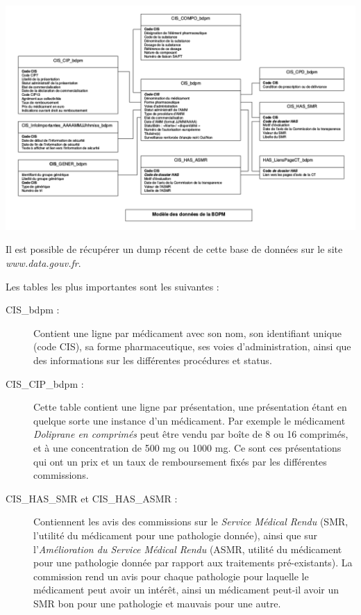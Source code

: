 \documentclass[a4paper, 12pt]{article}
\begin{document}
\begin{center}
\includegraphics[scale=0.45]{pics/schema.png}
\end{center} 

Il est possible de récupérer un dump récent de cette base de données sur le site \textit{www.data.gouv.fr}.

\smallskip

Les tables les plus importantes sont les suivantes :
\begin{description}
\item[CIS\_bdpm : ] Contient une ligne par médicament avec son nom, son identifiant unique (code CIS), sa forme pharmaceutique, ses voies d'administration, ainsi que des informations sur les différentes procédures et status.
\item[CIS\_CIP\_bdpm :] Cette table contient une ligne par présentation, une présentation étant en quelque sorte une instance d'un médicament. Par exemple le médicament \textit{Doliprane en comprimés} peut être vendu par boîte de 8 ou 16 comprimés, et à une concentration de 500 mg ou 1000 mg. Ce sont ces présentations qui ont un prix et un taux de remboursement fixés par les différentes commissions. 
\item[CIS\_HAS\_SMR et CIS\_HAS\_ASMR :] Contiennent les avis des commissions sur le \textit{Service Médical Rendu} (SMR, l'utilité du médicament pour une pathologie donnée), ainsi que sur l'\textit{Amélioration du Service Médical Rendu} (ASMR, utilité du médicament pour une pathologie donnée par rapport aux traitements pré-existants). La commission rend un avis pour chaque pathologie pour laquelle le médicament peut avoir un intérêt, ainsi un médicament peut-il avoir un SMR bon pour une pathologie et mauvais pour une autre.
\end{description}
\end{document}
